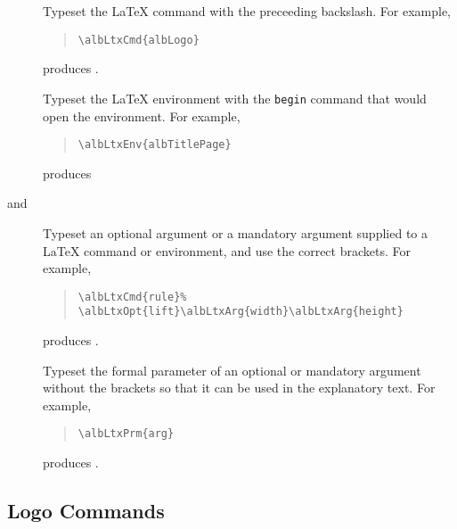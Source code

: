 \documentclass[11pt,a4paper,oneside,titlepage]{alb-corp}
\begin{document}
\begin{description}
\item[] Typeset the \LaTeX{} command
   with the preceeding backslash.  For example,
  \begin{quote}
\begin{verbatim}
\albLtxCmd{albLogo}
\end{verbatim}
  \end{quote}
  produces .

\item[] Typeset the \LaTeX{}
  environment  with the \texttt{begin} command that would
  open the environment.  For example,
  \begin{quote}
\begin{verbatim}
\albLtxEnv{albTitlePage}
\end{verbatim}
  \end{quote}
  produces 

\item[%
   and
  ] Typeset an optional argument  or a mandatory argument
   supplied to a \LaTeX{} command or environment, and use
  the correct brackets.  For example,
  \begin{quote}
\begin{verbatim}
\albLtxCmd{rule}%
\albLtxOpt{lift}\albLtxArg{width}\albLtxArg{height}
\end{verbatim}
  \end{quote}
  produces
  .

\item[] Typeset the formal parameter
  of an optional or mandatory argument without the brackets so that it
  can be used in the explanatory text.  For
  example,
  \begin{quote}
\begin{verbatim}
\albLtxPrm{arg}
\end{verbatim}
  \end{quote}
  produces .
\end{description}



\subsection{Logo Commands}
\label{sec:alb-corp-layout-documentation:logo-comm}
\end{document}
